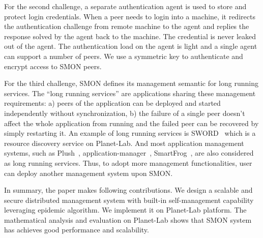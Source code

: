 For the second challenge, a separate authentication agent is
used to store and protect login credentials. When a peer
needs to login into a machine, it redirects the
authentication challenge from remote machine to the agent
and replies the response solved by the agent back to the
machine.  The credential is never leaked out of the agent.
The authentication load on the agent is light and a single
agent can support a number of peers.  We use a symmetric key
to authenticate and encrypt access to SMON peers. 

For the third challenge, SMON defines its management
semantic for long running services. The ``long running
services'' are applications sharing these management
requirements: a) peers of the application can be deployed
and started independently without synchronization, b) the
failure of a single peer doesn't affect the whole
application from running and the failed peer can be
recovered by simply restarting it. An example of long
running services is SWORD~\cite{sword_toit} which is a
resource discovery service on Planet-Lab.
And most application management systems, such as
Plush~\cite{Albrecht2007},
application-manager~\cite{appmanager},
SmartFrog~\cite{smartfrog}, are also considered as long
running services. Thus, to adopt more management
functionalities, user can deploy another management system
upon SMON.



In summary, the paper makes following contributions.  We
design a scalable and secure distributed management system
with built-in self-management capability leveraging epidemic
algorithm.  We implement it on Planet-Lab platform.  The
mathematical analysis and evaluation on Planet-Lab shows
that SMON system has achieves good performance and
scalability.

